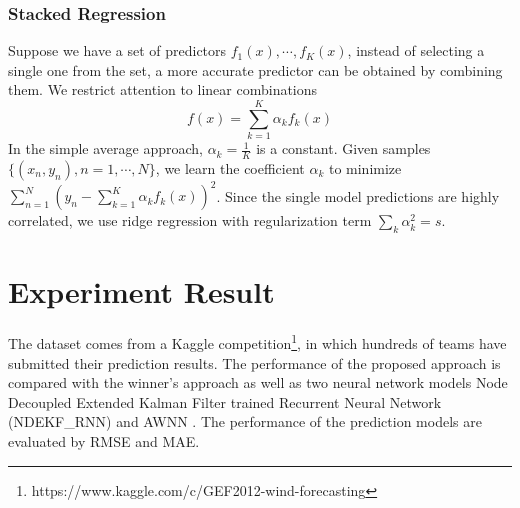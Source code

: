 \documentclass[conference]{IEEEtran}
\begin{document}
\subsubsection{Stacked Regression}
Suppose we have a set of predictors  $f_1(x), \cdots, f_K(x)$, instead of selecting a single one from the set, a more accurate predictor can be obtained by combining them. We restrict attention to linear combinations
\begin{equation}
    f(x) = \sum_{k=1}^K \alpha_k f_k(x)
\end{equation}
In the simple average approach, $\alpha_k = \frac{1}{K}$ is a constant. Given samples $\{(x_n,y_n),n=1,\cdots,N\}$, we learn the coefficient $\alpha_k$ to minimize $\sum_{n=1}^N (y_n - \sum_{k=1}^K \alpha_k f_k(x))^2$. Since the single model predictions are highly correlated, we use ridge regression with regularization term $\sum_k \alpha_k^2 = s$. %
%



\section{Experiment Result}
The dataset comes from a Kaggle competition\footnote{https://www.kaggle.com/c/GEF2012-wind-forecasting}, in which hundreds of teams have submitted their prediction results. The performance of the proposed approach is compared with the winner's approach \cite{SILVA2014395} as well as two neural network models Node Decoupled Extended Kalman Filter trained Recurrent Neural Network (NDEKF\_RNN) \cite{Kanna13} and AWNN \cite{7894735}. The performance of the prediction models are evaluated by RMSE and MAE.
\end{document}
